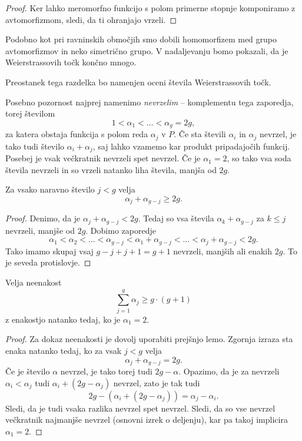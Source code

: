 \begin{proof}
Ker lahko meromorfno funkcijo s polom primerne stopnje komponiramo
z avtomorfizmom, sledi, da ti ohranjajo vrzeli.
\end{proof}

Podobno kot pri ravninskih območjih smo dobili homomorfizem med
grupo avtomorfizmov in neko simetrično grupo. V nadaljevanju bomo
pokazali, da je Weierstrassovih točk končno mnogo.

Preostanek tega razdelka bo namenjen oceni števila Weierstrassovih
točk.

Posebno pozornost najprej namenimo \emph{nevrzelim} -- komplementu
tega zaporedja, torej številom
\[
1 < \alpha_1 < \dots < \alpha_g = 2g,
\]
za katera obstaja funkcija s polom reda $\alpha_j$ v $P$. Če sta
števili $\alpha_i$ in $\alpha_j$ nevrzel, je tako tudi število
$\alpha_i + \alpha_j$, saj lahko vzamemo kar produkt pripadajočih
funkcij. Posebej je vsak večkratnik nevrzeli spet nevrzel. Če je
$\alpha_1 = 2$, so tako vsa soda števila nevrzeli in so vrzeli
natanko liha števila, manjša od $2g$.

\begin{lema}
Za vsako naravno število $j < g$ velja
\[
\alpha_j + \alpha_{g-j} \geq 2g.
\]
\end{lema}

\begin{proof}
Denimo, da je $\alpha_j + \alpha_{g-j} < 2g$. Tedaj so vsa števila
$\alpha_k + \alpha_{g-j}$ za $k \leq j$ nevrzeli, manjše od $2g$.
Dobimo zaporedje
\[
\alpha_1 < \alpha_2 < \dots < \alpha_{g-j} <
\alpha_1 + \alpha_{g-j} < \dots < \alpha_j + \alpha_{g-j} < 2g.
\]
Tako imamo skupaj vsaj $g-j + j + 1 = g + 1$ nevrzeli, manjših ali
enakih $2g$. To je seveda protislovje.
\end{proof}

\begin{lema}
\label{lm:nongap_ineq}
Velja neenakost
\[
\sum_{j=1}^{g} \alpha_j \geq g \cdot(g+1)
\]
z enakostjo natanko tedaj, ko je $\alpha_1 = 2$.
\end{lema}

\begin{proof}
Za dokaz neenakosti je dovolj uporabiti prejšnjo lemo. Zgornja
izraza sta enaka natanko tedaj, ko za vsak $j < g$ velja
\[
\alpha_j + \alpha_{g-j} = 2g.
\]
Če je število $\alpha$ nevrzel, je tako torej tudi $2g - \alpha$.
Opazimo, da je za nevrzeli $\alpha_i < \alpha_j$ tudi
$\alpha_i + (2g - \alpha_j)$ nevrzel, zato je tak tudi
\[
2g - (\alpha_i + (2g - \alpha_j)) = \alpha_j - \alpha_i.
\]
Sledi, da je tudi vsaka razlika nevrzel spet nevrzel. Sledi, da
so vse nevrzel večkratnik najmanjše nevrzel (osnovni izrek o
deljenju), kar pa takoj implicira $\alpha_1 = 2$.
\end{proof}

